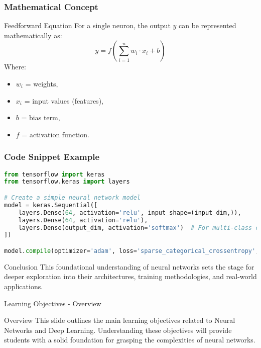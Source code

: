 \documentclass[aspectratio=169]{beamer}
\begin{document}
\begin{frame}[fragile]
    \frametitle{Mathematical Concept}
    \begin{block}{Feedforward Equation}
        For a single neuron, the output \( y \) can be represented mathematically as:
        \begin{equation}
            y = f\left(\sum_{i=1}^{n} w_i \cdot x_i + b\right)
        \end{equation}
        Where:
        \begin{itemize}
            \item \( w_i \) = weights,
            \item \( x_i \) = input values (features),
            \item \( b \) = bias term,
            \item \( f \) = activation function.
        \end{itemize}
    \end{block}
\end{frame}

\begin{frame}[fragile]
    \frametitle{Code Snippet Example}
    \begin{lstlisting}[language=Python]
from tensorflow import keras
from tensorflow.keras import layers

# Create a simple neural network model
model = keras.Sequential([
    layers.Dense(64, activation='relu', input_shape=(input_dim,)),
    layers.Dense(64, activation='relu'),
    layers.Dense(output_dim, activation='softmax')  # For multi-class classification
])

model.compile(optimizer='adam', loss='sparse_categorical_crossentropy', metrics=['accuracy'])
    \end{lstlisting}
    \begin{block}{Conclusion}
        This foundational understanding of neural networks sets the stage for deeper exploration into their architectures, training methodologies, and real-world applications.
    \end{block}
\end{frame}

\begin{frame}[fragile]{Learning Objectives - Overview}
    \begin{block}{Overview}
        This slide outlines the main learning objectives related to Neural Networks and Deep Learning. Understanding these objectives will provide students with a solid foundation for grasping the complexities of neural networks.
    \end{block}
\end{frame}
\end{document}
